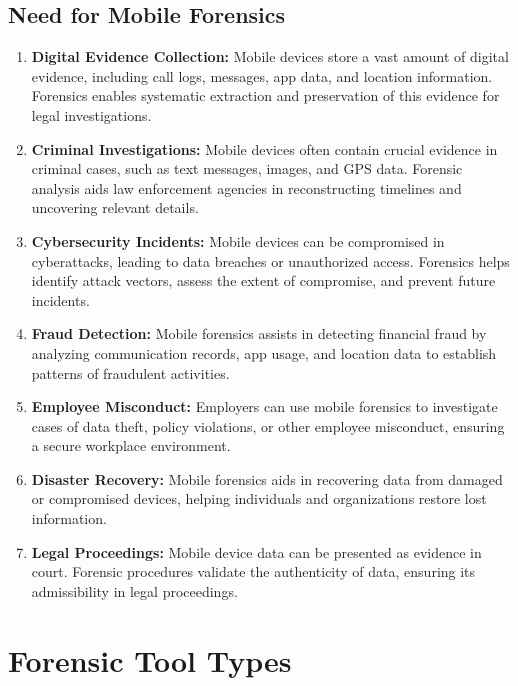 \documentclass[11pt]{article}
\begin{document}
\subsection{Need for Mobile Forensics}


\begin{enumerate}
    \item \textbf{Digital Evidence Collection:} Mobile devices store a vast amount of digital evidence, including call logs, messages, app data, and location information. Forensics enables systematic extraction and preservation of this evidence for legal investigations.

    \item \textbf{Criminal Investigations:} Mobile devices often contain crucial evidence in criminal cases, such as text messages, images, and GPS data. Forensic analysis aids law enforcement agencies in reconstructing timelines and uncovering relevant details.

    \item \textbf{Cybersecurity Incidents:} Mobile devices can be compromised in cyberattacks, leading to data breaches or unauthorized access. Forensics helps identify attack vectors, assess the extent of compromise, and prevent future incidents.

    \item \textbf{Fraud Detection:} Mobile forensics assists in detecting financial fraud by analyzing communication records, app usage, and location data to establish patterns of fraudulent activities.

    \item \textbf{Employee Misconduct:} Employers can use mobile forensics to investigate cases of data theft, policy violations, or other employee misconduct, ensuring a secure workplace environment.

    \item \textbf{Disaster Recovery:} Mobile forensics aids in recovering data from damaged or compromised devices, helping individuals and organizations restore lost information.

    \item \textbf{Legal Proceedings:} Mobile device data can be presented as evidence in court. Forensic procedures validate the authenticity of data, ensuring its admissibility in legal proceedings.
\end{enumerate}


\section{Forensic Tool Types}
\end{document}
